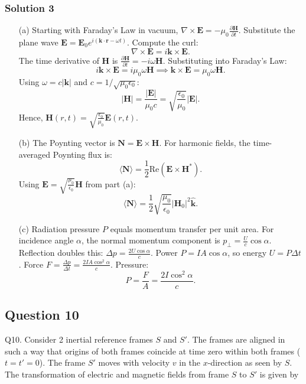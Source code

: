 \documentclass{article}
\begin{document}
\subsubsection{Solution 3}
\begin{enumerate}
    \item[(a)] Starting with Faraday's Law in vacuum, \(\nabla \times \mathbf{E} = -\mu_0 \frac{\partial \mathbf{H}}{\partial t}\). Substitute the plane wave \(\mathbf{E} = \mathbf{E}_0 e^{i(\mathbf{k} \cdot \mathbf{r} - \omega t)}\). Compute the curl:
    \[
    \nabla \times \mathbf{E} = i\mathbf{k} \times \mathbf{E}.
    \]
    The time derivative of \(\mathbf{H}\) is \(\frac{\partial \mathbf{H}}{\partial t} = -i\omega \mathbf{H}\). Substituting into Faraday's Law:
    \[
    i\mathbf{k} \times \mathbf{E} = i\mu_0 \omega \mathbf{H} \implies \mathbf{k} \times \mathbf{E} = \mu_0 \omega \mathbf{H}.
    \]
    Using \(\omega = c|\mathbf{k}|\) and \(c = 1/\sqrt{\mu_0 \epsilon_0}\):
    \[
    |\mathbf{H}| = \frac{|\mathbf{E}|}{\mu_0 c} = \sqrt{\frac{\epsilon_0}{\mu_0}} |\mathbf{E}|.
    \]
    Hence, \(\mathbf{H}(r,t) = \sqrt{\frac{\epsilon_0}{\mu_0}} \mathbf{E}(r,t)\).

    \item[(b)] The Poynting vector is \(\mathbf{N} = \mathbf{E} \times \mathbf{H}\). For harmonic fields, the time-averaged Poynting flux is:
    \[
    \langle \mathbf{N} \rangle = \frac{1}{2} \text{Re}(\mathbf{E} \times \mathbf{H}^*).
    \]
    Using \(\mathbf{E} = \sqrt{\frac{\mu_0}{\epsilon_0}} \mathbf{H}\) from part (a):
    \[
    \langle \mathbf{N} \rangle = \frac{1}{2} \sqrt{\frac{\mu_0}{\epsilon_0}} |\mathbf{H}_0|^2 \hat{\mathbf{k}}.
    \]
    
    \item[(c)] Radiation pressure \(P\) equals momentum transfer per unit area. For incidence angle \(\alpha\), the normal momentum component is \(p_\perp = \frac{U}{c} \cos \alpha\). Reflection doubles this: \(\Delta p = \frac{2U \cos \alpha}{c}\). Power \(P = I A \cos \alpha\), so energy \(U = P \Delta t\). Force \(F = \frac{\Delta p}{\Delta t} = \frac{2I A \cos^2 \alpha}{c}\). Pressure:
    \[
    P = \frac{F}{A} = \frac{2I \cos^2 \alpha}{c}.
    \]
\end{enumerate}

\subsection{Question 10}
Q10. Consider 2 inertial reference frames \( S \) and \( S' \). The frames are aligned in such a way that origins of both frames coincide at time zero within both frames (\( t = t' = 0 \)). The frame \( S' \) moves with velocity \( v \) in the \( x \)-direction as seen by \( S \). The transformation of electric and magnetic fields from frame \( S \) to \( S' \) is given by 
\end{document}
